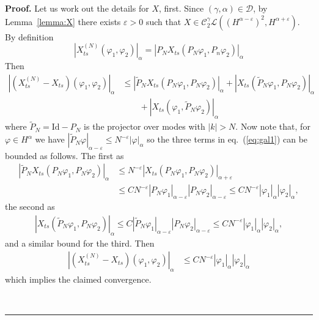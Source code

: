 \documentclass[a4paper,12pt,reqno]{article}
\newcommand{\eps}{\varepsilon}
\newcommand{\CC}{\mathcal{C}}
\newcommand{\DD}{\mathcal{D}}
\newcommand{\LL}{\mathcal{L}}
\newcommand{\wt}{\widetilde}
\newenvironment{proof}[1][Proof]{\textbf{#1.} }{\ \rule{0.5em}{0.5em}}
\begin{document}
\begin{proof}
Let us work out the details for $X$, first.
Since $(\gamma,\alpha) \in \DD$, by Lemma~\ref{lemma:X} there exists $\eps > 0$ such that $X \in \CC_2^\gamma \LL((H^{\alpha-\eps})^2,H^{\alpha+\eps})$.
By definition
$$
|X^{(N)}_{ts}(\varphi_1,\varphi_2)|_{\alpha} = | P_N  X_{ts}(P_N \varphi_1, P_n \varphi_2)|_\alpha
$$  
Then
\begin{equation}
\label{eq:gal1}
  \begin{split}
 | (X^{(N)}_{ts}-X_{ts})(\varphi_1,\varphi_2)|_{\alpha} & \le 
|\wt P_N X_{ts}(P_N \varphi_1,P_N \varphi_2)|_\alpha + |X_{ts}(\wt P_N \varphi_1,P_N \varphi_2)|_\alpha 
\\ & \qquad + |X_{ts}( \varphi_1,\wt P_N \varphi_2)|_\alpha 
  \end{split}
\end{equation}
where $\wt P_N = \text{Id}-P_N$ is the projector over modes with $|k| > N$. Now note that, for $\varphi \in H^{\alpha}$ we have 
$
|\wt P_N \varphi|_{\alpha-\eps} \le N^{-\eps} |\varphi|_\alpha
$
so the three terms in eq.~(\ref{eq:gal1}) can be bounded as follows.
The first as
\begin{equation*}
  \begin{split}
|\wt P_N X_{ts}(P_N \varphi_1,P_N \varphi_2)|_\alpha & \le N^{-\eps} |X_{ts}(P_N \varphi_1,P_N \varphi_2)|_{\alpha+\eps} 
\\ & \le C N^{-\eps} |P_N \varphi_1|_{\alpha-\eps} |P_N \varphi_2|_{\alpha-\eps}   
\le C N^{-\eps} |\varphi_1|_{\alpha} |\varphi_2|_{\alpha}     ,  
  \end{split}
\end{equation*}
the second as
\begin{equation*}
  \begin{split}
|X_{ts}(\wt P_N \varphi_1,P_N \varphi_2)|_\alpha  \le C  |\wt P_N \varphi_1|_{\alpha-\eps} |P_N \varphi_2|_{\alpha-\eps} 
 \le C  N^{-\eps} |\varphi_1|_{\alpha} |\varphi_2|_{\alpha} ,
  \end{split}
\end{equation*}
 and a similar bound for the third.
Then
\begin{equation}
\label{eq:gal2}
  \begin{split}
 | (X^{(N)}_{ts}-X_{ts})(\varphi_1,\varphi_2)|_{\alpha} & \le C N^{-\eps} |\varphi_1|_{\alpha} |\varphi_2|_{\alpha}
  \end{split}
\end{equation}
which implies the claimed convergence.


\end{proof}
\end{document}
